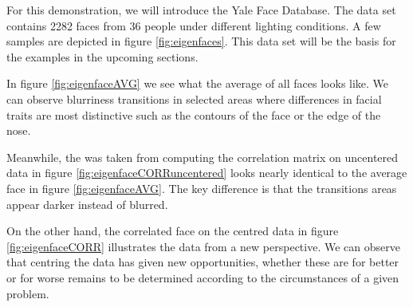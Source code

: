 \begin{minipage}[h][120mm][t]{0.55\linewidth}

    \setlength{\parindent}{2em}

    \bigskip

    \noindent
    For this demonstration, we will introduce the Yale Face Database.
    The data set contains 2282 faces from 36 people under different lighting conditions.
    A few samples are depicted in figure \ref{fig:eigenfaces}.
    This data set will be the basis for the examples in the upcoming sections.

    \bigskip

    In figure \ref{fig:eigenfaceAVG} we see what the average of all faces looks like.
    We can observe blurriness transitions in selected areas where differences in facial traits are most distinctive such as the contours of the face or the edge of the nose.

    \medskip

    Meanwhile, the was taken from computing the correlation matrix on uncentered data in figure \ref{fig:eigenfaceCORRuncentered} looks nearly identical to the average face in figure \ref{fig:eigenfaceAVG}.
    The key difference is that the transitions areas appear darker instead of blurred.

    \medskip

    On the other hand, the correlated face on the centred data in figure \ref{fig:eigenfaceCORR} illustrates the data from a new perspective.
    We can observe that centring the data has given new opportunities, whether these are for better or for worse remains to be determined according to the circumstances of a given problem.


\end{minipage}%
